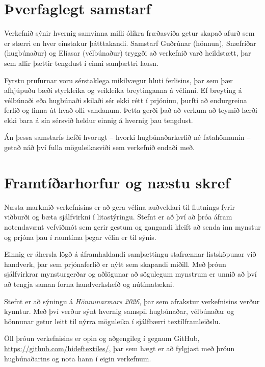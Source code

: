 \documentclass[a4paper,10pt,twocolumn]{article}
\begin{document}
\section{Þverfaglegt samstarf}
Verkefnið sýnir hvernig samvinna milli ólíkra fræðasviða getur skapað afurð sem er stærri en hver einstakur þátttakandi. Samstarf Guðrúnar (hönnun), Snæfríðar (hugbúnaður) og Elíasar (vélbúnaður) tryggði að verkefnið varð heildstætt, þar sem allir þættir tengdust í einni samþættri lausn.

Fyrstu prufurnar voru sérstaklega mikilvægur hluti ferlisins, þar sem þær afhjúpuðu bæði styrkleika og veikleika breytinganna á vélinni. Ef breyting á vélbúnaði eða hugbúnaði skilaði sér ekki rétt í prjóninu, þurfti að endurgreina ferlið og finna út hvað olli vandanum. Þetta gerði það að verkum að teymið lærði ekki bara á sín sérsvið heldur einnig á hvernig þau tengdust.

Án þessa samstarfs hefði hvorugt -- hvorki hugbúnaðarkerfið né fatahönnunin -- getað náð því fulla möguleikasviði sem verkefnið endaði með.


\section{Framtíðarhorfur og næstu skref}
Næsta markmið verkefnisins er að gera vélina auðveldari til flutnings fyrir viðburði og bæta sjálfvirkni í litastýringu. 
Stefnt er að því að þróa áfram notendavænt vefviðmót sem gerir gestum og gangandi kleift að senda inn mynstur og prjóna þau í rauntíma þegar vélin er til sýnis.

Einnig er áhersla lögð á áframhaldandi samþættingu stafrænnar listsköpunar við handverk, 
þar sem prjónaferlið er nýtt sem skapandi miðill. Með þróun sjálfvirkrar mynsturgerðar og aðlögunar að sögulegum mynstrum 
er unnið að því að tengja saman forna handverkshefð og nútímatækni.

Stefnt er að sýningu á \emph{Hönnunarmars 2026}, þar sem afrakstur verkefnisins verður kynntur. Með því verður sýnt hvernig
samspil hugbúnaðar, vélbúnaðar og hönnunar getur leitt til nýrra möguleika í sjálfbærri textílframleiðslu.

Öll þróun verkefnisins er opin og aðgengileg í gegnum GitHub, \url{https://github.com/hideftextiles/}, þar sem hægt er að fylgjast með þróun hugbúnaðarins og nota hann í eigin verkefnum. 

\printbibliography
\end{document}
